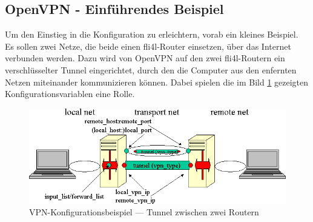 \subsection{OpenVPN - Einführendes Beispiel}

Um den Einstieg in die Konfiguration zu erleichtern, vorab ein kleines
Beispiel. Es sollen zwei Netze, die beide einen fli4l-Router
einsetzen, über das Internet verbunden werden. Dazu wird von OpenVPN
auf den zwei fli4l-Routern ein verschlüsselter Tunnel eingerichtet,
durch den die Computer aus den enfernten Netzen miteinander
kommunizieren können.  Dabei spielen die im Bild \ref{fig:tunnel}
gezeigten Konfigurationsvariablen eine Rolle.

  \begin{figure}[htbp]
    \centering
    \includegraphics[width=\columnwidth]{openvpn-sample}
    \caption{VPN-Konfigurationsbeispiel --- Tunnel zwischen zwei Routern}
    \label{fig:tunnel}
  \end{figure}

